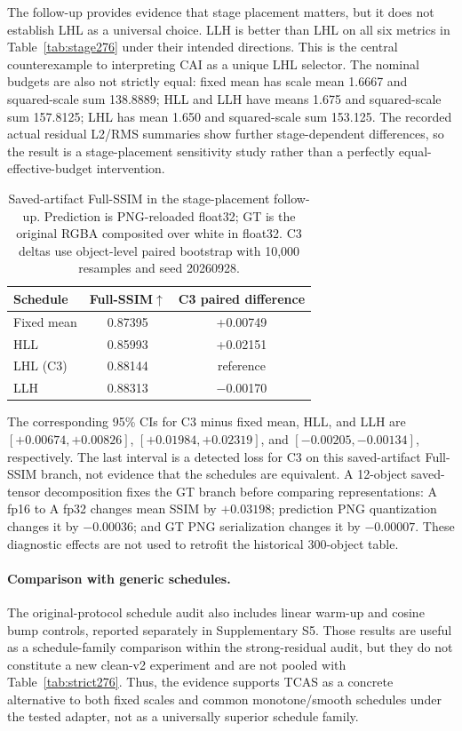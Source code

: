 \documentclass[times,twocolumn,final]{elsarticle}
\begin{document}
The follow-up provides evidence that stage placement matters, but it does not
establish LHL as a universal choice. LLH is better than LHL on all six metrics in
Table~\ref{tab:stage276} under their intended directions. This is the central
counterexample to interpreting CAI as a unique LHL selector. The nominal
budgets are also not strictly equal: fixed mean has scale mean 1.6667 and
squared-scale sum 138.8889; HLL and LLH have means 1.675 and squared-scale
sum 157.8125; LHL has mean 1.650 and squared-scale sum 153.125. The recorded
actual residual L2/RMS summaries show further stage-dependent differences, so
the result is a stage-placement sensitivity study rather than a perfectly
equal-effective-budget intervention.

\begin{table}[t]
\centering
\caption{Saved-artifact Full-SSIM in the stage-placement follow-up. Prediction is PNG-reloaded float32; GT is the original RGBA composited over white in float32. C3 deltas use object-level paired bootstrap with 10,000 resamples and seed 20260928.}
\label{tab:serialized276}
\small
\begin{tabular}{lcc}
\toprule
Schedule & Full-SSIM$\uparrow$ & C3 paired difference \\
\midrule
Fixed mean & 0.87395 & +0.00749 \\
HLL & 0.85993 & +0.02151 \\
LHL (C3) & 0.88144 & reference \\
LLH & 0.88313 & $-$0.00170 \\
\bottomrule
\end{tabular}
\end{table}

The corresponding 95\% CIs for C3 minus fixed mean, HLL, and LLH are
$[+0.00674,+0.00826]$, $[+0.01984,+0.02319]$, and
$[-0.00205,-0.00134]$, respectively. The last interval is a detected loss for
C3 on this saved-artifact Full-SSIM branch, not evidence that the schedules
are equivalent. A 12-object saved-tensor decomposition fixes the GT branch
before comparing representations: A fp16 to A fp32 changes mean SSIM by
$+0.03198$; prediction PNG quantization changes it by $-0.00036$; and GT PNG
serialization changes it by $-0.00007$. These diagnostic effects are not used
to retrofit the historical 300-object table.

\paragraph{Comparison with generic schedules.}
The original-protocol schedule audit also includes linear warm-up and cosine
bump controls, reported separately in Supplementary S5. Those results are
useful as a schedule-family comparison within the strong-residual audit, but
they do not constitute a new clean-v2 experiment and are not pooled with
Table~\ref{tab:strict276}. Thus, the evidence supports TCAS as a concrete
alternative to both fixed scales and common monotone/smooth schedules under
the tested adapter, not as a universally superior schedule family.
\end{document}
